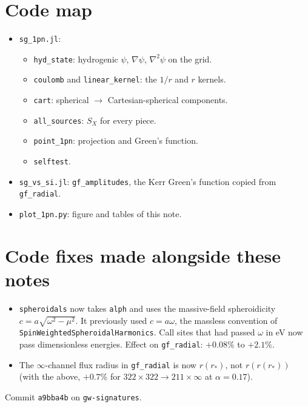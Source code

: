 \documentclass[11pt]{article}
\begin{document}
\section{Code map}
\begin{itemize}[nosep,leftmargin=1.4em]
\item \texttt{sg\_1pn.jl}:
\begin{itemize}[nosep]
\item \texttt{hyd\_state}: hydrogenic $\psi$, $\nabla\psi$, $\nabla^2\psi$ on the grid.
\item \texttt{coulomb} and \texttt{linear\_kernel}: the $1/r$ and $r$ kernels.
\item \texttt{cart}: spherical $\to$ Cartesian-spherical components.
\item \texttt{all\_sources}: $S_X$ for every piece.
\item \texttt{point\_1pn}: projection and Green's function.
\item \texttt{selftest}.
\end{itemize}
\item \texttt{sg\_vs\_si.jl}: \texttt{gf\_amplitudes}, the Kerr Green's function copied from \texttt{gf\_radial}.
\item \texttt{plot\_1pn.py}: figure and tables of this note.
\end{itemize}

\section{Code fixes made alongside these notes}
\sloppy
\begin{itemize}[leftmargin=1.4em]
\item \texttt{spheroidals} now takes \texttt{alph} and uses the massive-field spheroidicity $c=a\sqrt{\omega^2-\mu^2}$. It previously used $c=a\omega$, the massless convention of \texttt{SpinWeightedSpheroidalHarmonics}. Call sites that had passed $\omega$ in eV now pass dimensionless energies. Effect on \texttt{gf\_radial}: $+0.08\%$ to $+2.1\%$.
\item The $\infty$-channel flux radius in \texttt{gf\_radial} is now $r(r_*)$, not $r(r(r_*))$ (with the above, $+0.7\%$ for $322\times322\to211\times\infty$ at $\alpha=0.17$).
\end{itemize}
Commit \texttt{a9bba4b} on \texttt{gw-signatures}.
\end{document}
